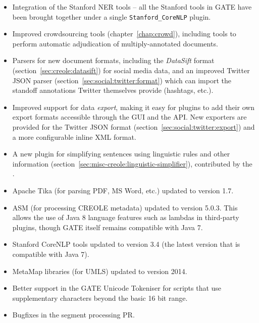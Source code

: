 

\begin{itemize}
\item Integration of the Stanford NER tools -- all the Stanford tools in GATE
  have been brought together under a single \texttt{Stanford\_CoreNLP} plugin.
\item Improved crowdsourcing tools (chapter~\ref{chap:crowd}), including tools
  to perform automatic adjudication of multiply-annotated documents.
\item Parsers for new document formats, including the \emph{DataSift} format
  (section~\ref{sec:creole:datasift}) for social media data, and an improved
  Twitter JSON parser (section~\ref{sec:social:twitter:format}) which can import
  the standoff annotations Twitter themselves provide (hashtags, etc.).
\item Improved support for data \emph{export}, making it easy for plugins to
  add their own export formats accessible through the GUI and the API. New
  exporters are provided for the Twitter JSON format
  (section~\ref{sec:social:twitter:export}) and a more configurable inline
  XML format.
\item A new plugin for simplifying sentences using linguistic rules and other
  information (section~\ref{sec:misc-creole:linguistic-simplifier}), contributed
  by the .
\end{itemize}


\begin{itemize}
\item Apache Tika (for parsing PDF, MS Word, etc.) updated to version 1.7.
\item ASM (for processing CREOLE metadata) updated to version 5.0.3.  This
  allows the use of Java 8 language features such as lambdas in third-party
  plugins, though GATE itself remains compatible with Java 7.
\item Stanford CoreNLP tools updated to version 3.4 (the latest version
  that is compatible with Java 7).
\item MetaMap libraries (for UMLS) updated to version 2014.
\item Better support in the GATE Unicode Tokeniser for scripts that use
  supplementary characters beyond the basic 16 bit range.
\item Bugfixes in the segment processing PR.
\end{itemize}

